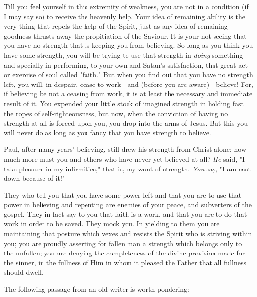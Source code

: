 \documentclass[
]{book}
\begin{document}
Till you feel yourself in this extremity of weakness, you are not in a condition (if I may say so) to receive the heavenly help. Your idea of remaining ability is the very thing that repels the help of the Spirit, just as any idea of remaining goodness thrusts away the propitiation of the Saviour. It is your not seeing that you have no strength that is keeping you from believing. So long as you think you have some strength, you will be trying to use that strength in \emph{doing} something---and specially in performing, to your own and Satan's satisfaction, that great act or exercise of soul called "faith." But when you find out that you have no strength left, you will, in despair, cease to work---and (before you are aware)---believe! For, if believing be not a ceasing from work, it is at least the necessary and immediate result of it. You expended your little stock of imagined strength in holding fast the ropes of self-righteousness, but now, when the conviction of having no strength at all is forced upon you, you drop into the arms of Jesus. But this you will never do as long as you fancy that you have strength to believe.

Paul, after many years' believing, still drew his strength from Christ alone; how much more must you and others who have never yet believed at all? \emph{He} said, "I take pleasure in my infirmities," that is, my want of strength. \emph{You} say, "I am cast down because of it!"

They who tell you that you have some power left and that you are to use that power in believing and repenting are enemies of your peace, and subverters of the gospel. They in fact say to you that faith is a work, and that you are to do that work in order to be saved. They mock you. In yielding to them you are maintaining that posture which vexes and resists the Spirit who is striving within you; you are proudly asserting for fallen man a strength which belongs only to the unfallen; you are denying the completeness of the divine provision made for the sinner, in the fullness of Him in whom it pleased the Father that all fullness should dwell.

The following passage from an old writer is worth pondering:
\end{document}
